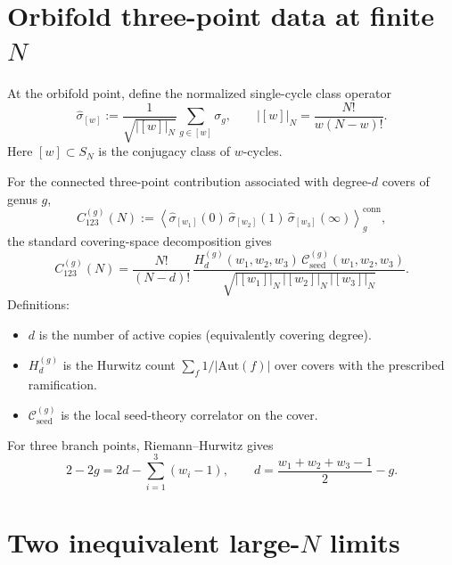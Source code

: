 \documentclass[11pt]{article}
\newcommand{\mc}[1]{\mathcal{#1}}
\begin{document}
\section{Orbifold three-point data at finite \texorpdfstring{$N$}{N}}
At the orbifold point, define the normalized single-cycle class operator
\begin{equation}\label{eq:class-op}
\widehat{\sigma}_{[w]}
:=
\frac{1}{\sqrt{|[w]|_N}}
\sum_{g\in [w]}\sigma_g,
\qquad
|[w]|_N=\frac{N!}{w(N-w)!}.
\end{equation}
Here $[w]\subset S_N$ is the conjugacy class of $w$-cycles.

For the connected three-point contribution associated with degree-$d$ covers of genus $g$,
\begin{equation}\label{eq:C123-def}
C_{123}^{(g)}(N)
:=
\left\langle
\widehat{\sigma}_{[w_1]}(0)\,
\widehat{\sigma}_{[w_2]}(1)\,
\widehat{\sigma}_{[w_3]}(\infty)
\right\rangle_{g}^{\mathrm{conn}},
\end{equation}
the standard covering-space decomposition gives
\begin{equation}\label{eq:C123-exact}
C_{123}^{(g)}(N)
=
\frac{N!}{(N-d)!}\,
\frac{
H_d^{(g)}(w_1,w_2,w_3)\,
\mc C_{\mathrm{seed}}^{(g)}(w_1,w_2,w_3)
}{
\sqrt{|[w_1]|_N\,|[w_2]|_N\,|[w_3]|_N}
}.
\end{equation}
Definitions:
\begin{itemize}
\item $d$ is the number of active copies (equivalently covering degree).
\item $H_d^{(g)}$ is the Hurwitz count $\sum_f 1/|\mathrm{Aut}(f)|$ over covers with the prescribed ramification.
\item $\mc C_{\mathrm{seed}}^{(g)}$ is the local seed-theory correlator on the cover.
\end{itemize}

For three branch points, Riemann--Hurwitz gives
\begin{equation}\label{eq:RH}
2-2g
=
2d-\sum_{i=1}^3(w_i-1),
\qquad
d=\frac{w_1+w_2+w_3-1}{2}-g.
\end{equation}

\section{Two inequivalent large-\texorpdfstring{$N$}{N} limits}
\end{document}
